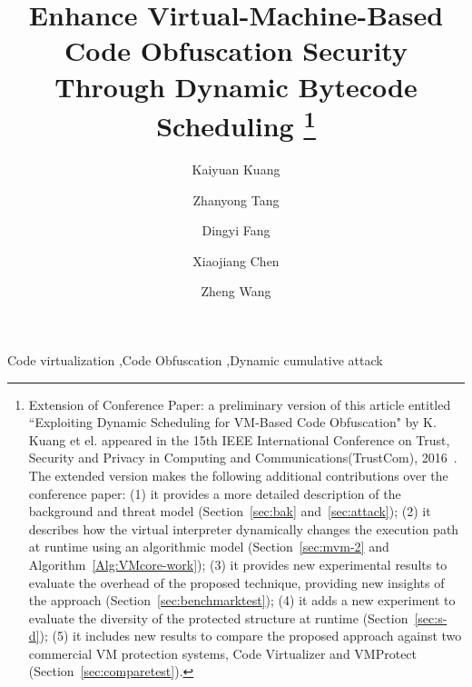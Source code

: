 \documentclass[preprint,12pt,3p]{elsarticle}
\begin{document}
\begin{frontmatter}

\title{
Enhance Virtual-Machine-Based Code Obfuscation Security Through Dynamic Bytecode Scheduling
\footnote{
Extension of Conference Paper: a preliminary version of this article entitled ``Exploiting Dynamic Scheduling for VM-Based Code Obfuscation" by K. Kuang et el. appeared in the 15th IEEE International Conference on Trust, Security and
Privacy in Computing and Communications(TrustCom), 2016~\cite{kuang2016exploiting}. The extended version makes the following additional contributions over the conference paper: (1) it provides a more detailed description of the background and threat model (Section~\ref{sec:bak} and~\ref{sec:attack}); (2) it describes how the virtual interpreter dynamically changes the execution path at runtime using an algorithmic model (Section~\ref{sec:mvm-2} and Algorithm~\ref{Alg:VMcore-work}); (3) it provides new experimental results to evaluate the overhead of the proposed technique, providing new insights of the approach (Section~\ref{sec:benchmarktest}); (4) it adds a new experiment to evaluate the diversity of the protected structure at runtime (Section~\ref{sec:s-d}); (5) it includes new results to compare the proposed approach against two commercial VM protection systems, Code Virtualizer and VMProtect (Section~\ref{sec:comparetest}).
}
}

\author[label1]{Kaiyuan Kuang}
\address[label1]{School of Information Science and Technology, Northwest University, China.}
\address[label2]{School of Computing and Communications, Lancaster University, UK}%




\author[label1]{Zhanyong Tang}

\author[label1]{Dingyi Fang}

\author[label1]{Xiaojiang Chen}

\author[label2]{Zheng Wang}



\begin{keyword}
Code virtualization \sep Code Obfuscation \sep Dynamic cumulative attack
\end{keyword}

\end{frontmatter}
\end{document}
